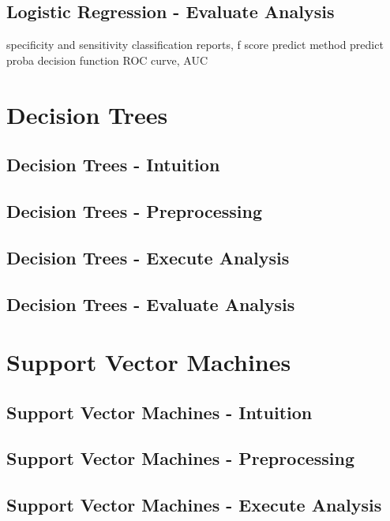 \documentclass[sigconf]{acmart}
\begin{document}
\subsection{Logistic Regression - Evaluate Analysis}

specificity and sensitivity
classification reports, f score
predict method
predict proba
decision function
ROC curve, AUC

\section{Decision Trees}

\subsection{Decision Trees - Intuition}

\subsection{Decision Trees - Preprocessing}

\subsection{Decision Trees - Execute Analysis}

\subsection{Decision Trees - Evaluate Analysis}


\section{Support Vector Machines}

\subsection{Support Vector Machines - Intuition}

\subsection{Support Vector Machines - Preprocessing}

\subsection{Support Vector Machines - Execute Analysis}
\end{document}
